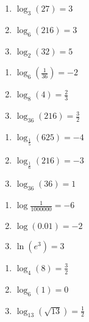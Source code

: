 \documentclass{ximera}
\begin{document}
\begin{multicols}{3}
\begin{enumerate}
\setcounter{enumi}{\value{HW}}

\item $\log_{3} (27) = 3$
\item $\log_{6} (216) = 3$
\item $\log_{2} (32) = 5$

\setcounter{HW}{\value{enumi}}
\end{enumerate}
\end{multicols}

\begin{multicols}{3}
\begin{enumerate}
\setcounter{enumi}{\value{HW}}


\item  $\log_{6} \left( \frac{1}{36} \right) = -2$
\item $\log_{8} (4) = \frac{2}{3}$
\item $\log_{36} (216) = \frac{3}{2}$

\setcounter{HW}{\value{enumi}}
\end{enumerate}
\end{multicols}

\begin{multicols}{3}
\begin{enumerate}
\setcounter{enumi}{\value{HW}}


\item $\log_{\frac{1}{5}} (625) = -4$
\item  $\log_{\frac{1}{6}} (216) = -3$
\item $\log_{36} (36)=1$ 

\setcounter{HW}{\value{enumi}}
\end{enumerate}
\end{multicols}

\begin{multicols}{3}
\begin{enumerate}
\setcounter{enumi}{\value{HW}}


\item $\log \frac{1}{1000000} = -6$
\item $\log(0.01) = -2$
\item $\ln\left(e^3\right) = 3$

\setcounter{HW}{\value{enumi}}
\end{enumerate}
\end{multicols}

\begin{multicols}{3}
\begin{enumerate}
\setcounter{enumi}{\value{HW}}


\item $\log_{4} (8) = \frac{3}{2}$
\item $\log_{6} (1) = 0$
\item $\log_{13} \left(\sqrt{13}\right) = \frac{1}{2}$

\setcounter{HW}{\value{enumi}}
\end{enumerate}
\end{multicols}
\end{document}
